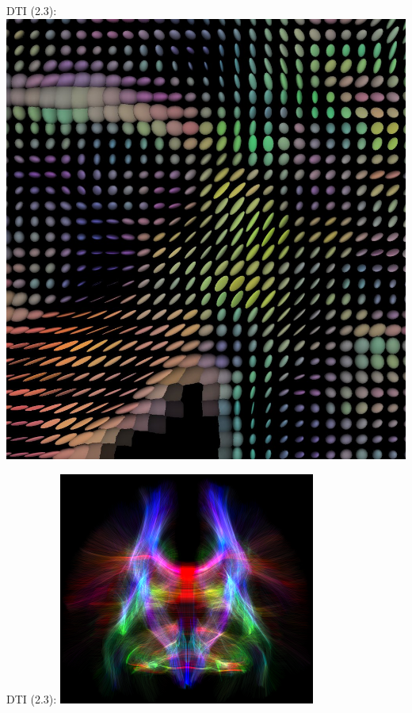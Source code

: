 \documentclass{beamer}
\begin{document}
\begin{frame}
	DTI (2.3):
	\includegraphics[width=\textwidth]{images/dti}
\end{frame}

\begin{frame}
	DTI (2.3):
	\includegraphics[width=\textwidth]{images/tractography}
\end{frame}
\end{document}
